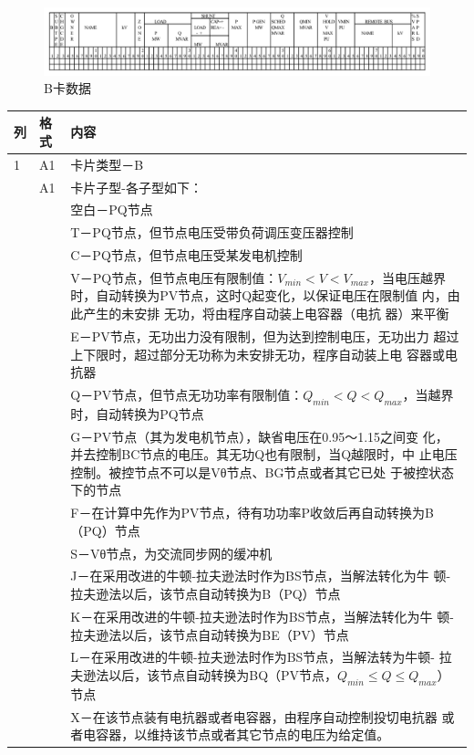 \begin{figure}[H]
\centering
\includegraphics[width=1.05\textwidth]{images/Paper_Fig_17.png}
\setcaptionwidth{\linewidth}
\caption{B卡数据}
\end{figure}

\begin{spacing}{1.0}
\begin{longtable}[h]{llp{}}
\toprule
列 & 格式 & 内容\\
 \midrule
1 & A1 & 卡片类型－B\\
 & A1 & 卡片子型-各子型如下： \\ 
 & & 空白－PQ节点\\ & &
T－PQ节点，但节点电压受带负荷调压变压器控制\\ & &
C－PQ节点，但节点电压受某发电机控制\\ & &
V－PQ节点，但节点电压有限制值：$V_{min}<V<V_{max}$，当电压越界
时，自动转换为PV节点，这时Q起变化，以保证电压在限制值
内，由此产生的未安排	无功，将由程序自动装上电容器（电抗
器）来平衡 \\ & &
E－PV节点，无功出力没有限制，但为达到控制电压，无功出力
超过上下限时，超过部分无功称为未安排无功，程序自动装上电
容器或电抗器 \\ & &
Q－PV节点，但节点无功功率有限制值：$Q_{min}<Q<Q_{max}$，当越界
时，自动转换为PQ节点 \\ & &
G－PV节点（其为发电机节点），缺省电压在0.95～1.15之间变
化，并去控制BC节点的电压。其无功Q也有限制，当Q越限时，中
止电压控制。被控节点不可以是Vθ节点、BG节点或者其它已处
于被控状态下的节点 \\ & &
F－在计算中先作为PV节点，待有功功率P收敛后再自动转换为B
（PQ）节点 \\ & &
S－Vθ节点，为交流同步网的缓冲机 \\ & &
J－在采用改进的牛顿-拉夫逊法时作为BS节点，当解法转化为牛
顿-拉夫逊法以后，该节点自动转换为B（PQ）节点 \\ & &
K－在采用改进的牛顿-拉夫逊法时作为BS节点，当解法转化为牛
顿-拉夫逊法以后，该节点自动转换为BE（PV）节点 \\ & &
L－在采用改进的牛顿-拉夫逊法时作为BS节点，当解法转为牛顿-
拉夫逊法以后，该节点自动转换为BQ（PV节点，$Q_{min}\leqslant Q\leqslant
Q_{max}$）节点 \\ & &
X－在该节点装有电抗器或者电容器，由程序自动控制投切电抗器
或者电容器，以维持该节点或者其它节点的电压为给定值。\\
 
\bottomrule
\end{longtable}
\end{spacing}

